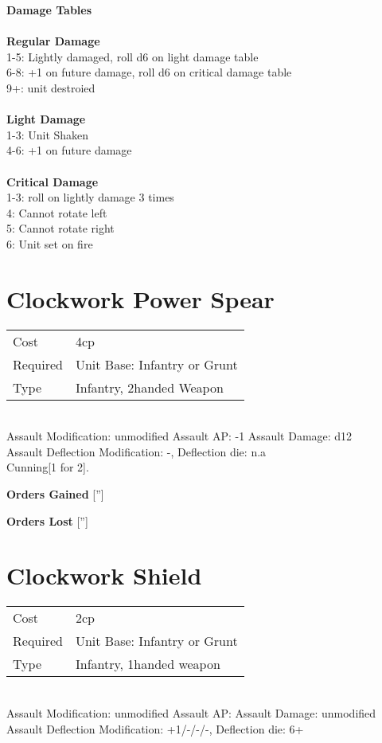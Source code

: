 {\bf Damage Tables} \\
\ \\ {\bf Regular Damage } \\
1-5: Lightly damaged, roll d6 on light damage table \\
6-8: +1 on future damage, roll d6 on critical damage table \\
9+: unit destroied \\
\ \\ {\bf Light Damage } \\
1-3: Unit Shaken \\
4-6: +1 on future damage \\
\ \\ {\bf Critical Damage  } \\
1-3: roll on lightly damage 3 times \\
4: Cannot rotate left \\
5: Cannot rotate right \\
6: Unit set on fire \\









\pagebreak\section{ Clockwork Power Spear }

\begin{tabular}{ll}
    Cost & 4cp \\
    Required & Unit Base: Infantry or Grunt\\
    Type & Infantry, 2handed Weapon\\
\end{tabular}
\ \\
Assault Modification: unmodified Assault AP: -1 Assault Damage: d12\\
Assault Deflection Modification: -, Deflection die: n.a \\
Cunning[1 for 2].



{\bf Orders Gained}
['']

{\bf Orders Lost}
['']
\section{ Clockwork Shield }

\begin{tabular}{ll}
    Cost & 2cp \\
    Required & Unit Base: Infantry or Grunt\\
    Type & Infantry, 1handed weapon\\
\end{tabular}
\ \\
Assault Modification: unmodified Assault AP:  Assault Damage: unmodified\\
Assault Deflection Modification: +1/-/-/-, Deflection die: 6+ \\


